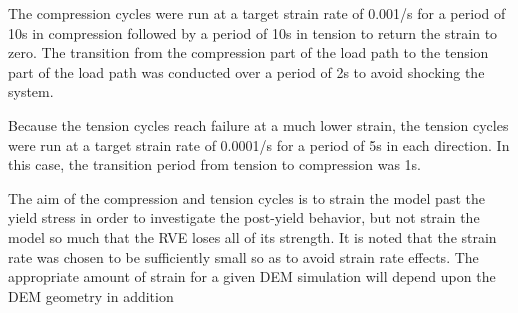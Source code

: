 The compression cycles were run at a target strain rate of 0.001/s
for a period of 10s in compression followed by a period of 10s in
tension to return the strain to zero. The transition from the compression
part of the load path to the tension part of the load path was conducted
over a period of 2s to avoid shocking the system.

Because the tension cycles reach failure at a much lower strain, the
tension cycles were run at a target strain rate of 0.0001/s for a
period of 5s in each direction. In this case, the transition period
from tension to compression was 1s.

The aim of the compression and tension cycles is to strain the model
past the yield stress in order to investigate the post-yield behavior,
but not strain the model so much that the RVE loses all of its strength.
It is noted that the strain rate was chosen to be sufficiently small
so as to avoid strain rate effects. The appropriate amount of strain
for a given DEM simulation will depend upon the DEM geometry in addition
